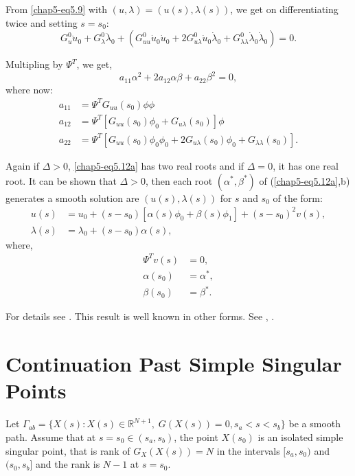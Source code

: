 From \eqref{chap5-eq5.9} with $(u,\lambda)=(u(s),\lambda(s))$, we get on
differentiating twice and setting $s=s_0$: 
$$
G^0_u \ddot{u}_0 +G^0_\lambda \ddot{\lambda}_0 + (G^0_{uu} \dot{u}_0
\dot{u}_0 + 2G^0_{u \lambda} \dot{u}_0 \dot{\lambda}_0+G^0_{\lambda
\lambda} \dot{\lambda}_0 \dot{\lambda}_0)=0. 
$$

Multipling by $\Psi^T$, we get,
\begin{equation}
a_{11} \alpha^2 +2a_{12}\alpha \beta +a_{22}\beta^2 =0,
\tag{5.12a}\label{chap5-eq5.12a} 
\end{equation}
where now:
\begin{equation*}
\begin{split}
a_{11} & = \Psi^T G_{uu}(s_0)\phi \phi \\ 
a_{12} & = \Psi^T [G_{uu}(s_0)\phi_0 +G_{u \lambda}(s_0)]\phi\\ 
a_{22} & = \Psi^T [G_{uu}(s_0)\phi_0 \phi_0 +2G_{u
    \lambda}(s_0)\phi_0 +G_{\lambda \lambda}(s_0)]. 
\end{split}\tag{5.12b}\label{chap5-eq5.12b}
\end{equation*}\pageoriginale

Again if $\Delta > 0$, \eqref{chap5-eq5.12a} has two real roots and if
$\Delta = 0$, it has one real root. It can be shown that $\Delta > 0$, then each
root $(\alpha^* , \beta^*)$ of (\ref{chap5-eq5.12a},b) generates a
smooth solution are $(u(s),\lambda(s))$ for $s$ and $s_0$ of the form: 
\begin{align*}
u(s) & =u_0+(s-s_0)[\alpha(s)\phi_0 + \beta(s)\phi_1]+(s-s_0)^2 v(s), \\
\lambda(s) & =\lambda_0+(s-s_0)\alpha(s),
\end{align*}
where,
\begin{align*}
\Psi^T v(s) &=0,\\
\alpha(s_0) &=\alpha^*,\\
\beta(s_0) &=\beta^*.
\end{align*}

For details see \cite{key7}. This result is well known in other forms. See
\cite{key5}, \cite{key26}. 

\setcounter{section}{12}
\section{Continuation Past Simple Singular
  Points}\label{chap5-sec5.13}%

Let $\Gamma_{ab}=\{X(s):X(s) \in \mathbb{R}^{N+1}, \;  G(X(s))=0,
s_a < s <s_b\}$ be a smooth path. Assume that at $s=s_0 \in
(s_a,s_b)$, the point $X(s_0)$ is an isolated simple singular
point, that is rank of $G_X(X(s))=N$ in the intervals $[s_a,s_0)$
  and $(s_0,s_b]$ and the rank is $N-1$ at $s=s_0$. 

